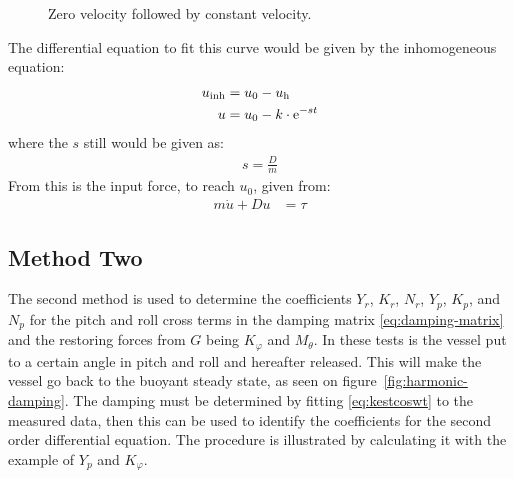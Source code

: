 \begin{figure}[htbp]
	\centering
	
	\caption{Zero velocity followed by constant velocity.}
	\label{fig:phase1}
\end{figure}
The differential equation to fit this curve would be given by the inhomogeneous equation:
\begin{align}
u_{\text{inh}} &= u_0 - u_{\text{h}}\\
u &= u_0 - k \cdot \mathrm{e}^{-st}
\end{align}
where the $s$ still would be given as:
\begin{align}
s = \frac{D}{m}
\end{align}
From this is the input force, to reach $u_0$, given from:
\begin{align}
m \dot u + Du &= \tau
\end{align}

\subsection{Method Two}
\label{subsec:methodtwo}
The second method is used to determine the coefficients $Y_r$, $K_r$,
$N_r$, $Y_p$, $K_p$, and $N_p$ for the pitch and
roll cross terms in the damping matrix \eqref{eq:damping-matrix} and the restoring forces from $G$ being $K_\varphi$ and $M_\theta$. In
these tests is the vessel put to a certain angle in pitch and roll and
hereafter released. This will make the vessel go back to the buoyant
steady state, as seen on figure~\vref{fig:harmonic-damping}. The
damping must be determined by fitting \eqref{eq:kestcoswt} to the
measured data, then this can be used to identify the coefficients for
the second order differential equation. The procedure is illustrated by
calculating it with the example of $Y_p$ and $K_\varphi$.

